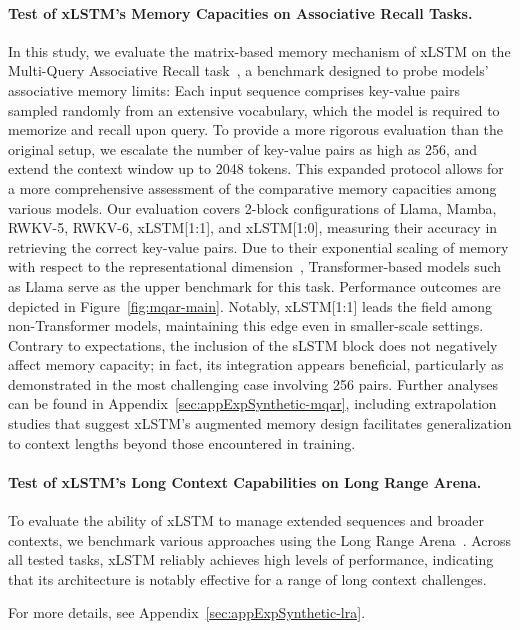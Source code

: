 \paragraph{Test of xLSTM's Memory Capacities on Associative Recall Tasks.} In this study, we evaluate the matrix-based memory mechanism of xLSTM on the Multi-Query Associative Recall task~\citep{Arora:23arxiv}, a benchmark designed to probe models' associative memory limits: Each input sequence comprises key-value pairs sampled randomly from an extensive vocabulary, which the model is required to memorize and recall upon query. To provide a more rigorous evaluation than the original setup, we escalate the number of key-value pairs as high as 256, and extend the context window up to 2048 tokens. This expanded protocol allows for a more comprehensive assessment of the comparative memory capacities among various models. Our evaluation covers 2-block configurations of Llama, Mamba, RWKV-5, RWKV-6, xLSTM[1:1], and xLSTM[1:0], measuring their accuracy in retrieving the correct key-value pairs. Due to their exponential scaling of memory with respect to the representational dimension~\citep{Ramsauer:21}, Transformer-based models such as Llama serve as the upper benchmark for this task. Performance outcomes are depicted in Figure~\ref{fig:mqar-main}. Notably, xLSTM[1:1] leads the field among non-Transformer models, maintaining this edge even in smaller-scale settings. Contrary to expectations, the inclusion of the sLSTM block does not negatively affect memory capacity; in fact, its integration appears beneficial, particularly as demonstrated in the most challenging case involving 256 pairs. Further analyses can be found in Appendix~\ref{sec:appExpSynthetic-mqar}, including extrapolation studies that suggest xLSTM's augmented memory design facilitates generalization to context lengths beyond those encountered in training.

\paragraph{Test of xLSTM's Long Context Capabilities on Long Range Arena.} To evaluate the ability of xLSTM to manage extended sequences and broader contexts, we benchmark various approaches using the Long Range Arena~\citep{Tay:21}. Across all tested tasks, xLSTM reliably achieves high levels of performance, indicating that its architecture is notably effective for a range of long context challenges.

For more details, see Appendix~\ref{sec:appExpSynthetic-lra}.

